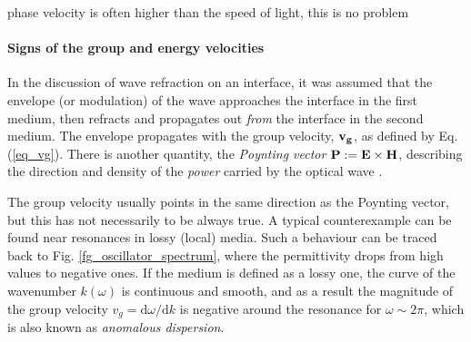 phase velocity is often higher than the speed of light, this is no problem\\

\paragraph{Signs of the group and energy velocities}  %
In the discussion of wave refraction on an interface, it was assumed that the envelope (or modulation) of the wave approaches the interface in the first medium, then refracts and propagates out \textit{from} the interface in the second medium. The envelope propagates with the group velocity, ${\mathbf{v_g}}$, as defined by Eq. (\ref{eq_vg}). There is another quantity, the \textit{Poynting vector} $\mathbf{P} := \mathbf{E}\times\mathbf{H}$, describing the direction and density of the \textit{power} carried by the optical wave \cite[p. 16]{klingshirn2007semiconductor}. 

The group velocity usually points in the same direction as the Poynting vector, but this has not necessarily to be always true. A typical counterexample can be found near resonances in lossy (local) media. Such a behaviour can be traced back to Fig. \ref{fg_oscillator_spectrum}, where the permittivity drops from high values to negative ones. If the medium is defined as a lossy one, the curve of the wavenumber $k(\omega)$ is continuous and smooth, and as a result the magnitude of the group velocity $v_g = \mathrm{d}\omega / \mathrm{d}k$ is negative around the resonance for $\omega \sim 2\pi$, %
which is also known as \textit{anomalous dispersion}. 

